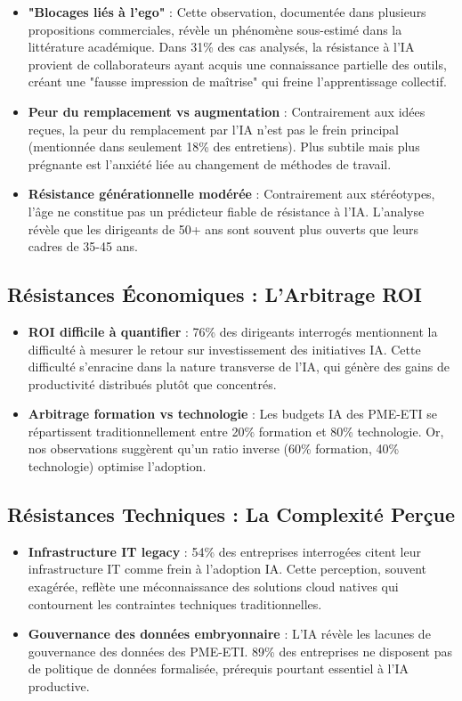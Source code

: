 \begin{itemize}
    \item \textbf{"Blocages liés à l'ego"} : Cette observation, documentée dans plusieurs propositions commerciales, révèle un phénomène sous-estimé dans la littérature académique. Dans 31\% des cas analysés, la résistance à l'IA provient de collaborateurs ayant acquis une connaissance partielle des outils, créant une "fausse impression de maîtrise" qui freine l'apprentissage collectif.
    \item \textbf{Peur du remplacement vs augmentation} : Contrairement aux idées reçues, la peur du remplacement par l'IA n'est pas le frein principal (mentionnée dans seulement 18\% des entretiens). Plus subtile mais plus prégnante est l'anxiété liée au changement de méthodes de travail.
    \item \textbf{Résistance générationnelle modérée} : Contrairement aux stéréotypes, l'âge ne constitue pas un prédicteur fiable de résistance à l'IA. L'analyse révèle que les dirigeants de 50+ ans sont souvent plus ouverts que leurs cadres de 35-45 ans.
\end{itemize}

\subsection{Résistances Économiques : L'Arbitrage ROI}

\begin{itemize}
    \item \textbf{ROI difficile à quantifier} : 76\% des dirigeants interrogés mentionnent la difficulté à mesurer le retour sur investissement des initiatives IA. Cette difficulté s'enracine dans la nature transverse de l'IA, qui génère des gains de productivité distribués plutôt que concentrés.
    \item \textbf{Arbitrage formation vs technologie} : Les budgets IA des PME-ETI se répartissent traditionnellement entre 20\% formation et 80\% technologie. Or, nos observations suggèrent qu'un ratio inverse (60\% formation, 40\% technologie) optimise l'adoption.
\end{itemize}

\subsection{Résistances Techniques : La Complexité Perçue}

\begin{itemize}
    \item \textbf{Infrastructure IT legacy} : 54\% des entreprises interrogées citent leur infrastructure IT comme frein à l'adoption IA. Cette perception, souvent exagérée, reflète une méconnaissance des solutions cloud natives qui contournent les contraintes techniques traditionnelles.
    \item \textbf{Gouvernance des données embryonnaire} : L'IA révèle les lacunes de gouvernance des données des PME-ETI. 89\% des entreprises ne disposent pas de politique de données formalisée, prérequis pourtant essentiel à l'IA productive.
\end{itemize}

